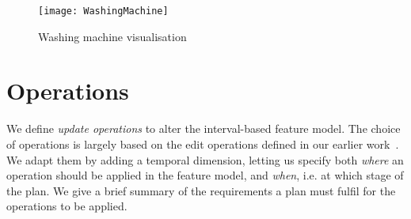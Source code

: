 \begin{figure}[htpb]
  \centering
  \texttt{[image: WashingMachine]}
  \caption{Washing machine visualisation}
  \label{ex:washing-machine-visual}
\end{figure}

\section{Operations}
\label{sec:operations}

We define \emph{update operations} to alter the interval-based feature model. The choice of operations is largely based on the edit operations defined in our earlier work~\cite{art:consistency-preserving-evolution-planning}. We adapt them by adding a temporal dimension, letting us specify both \emph{where} an operation should be applied in the feature model, and \emph{when}, i.e. at which stage of the plan. We give a brief summary of the requirements a plan must fulfil for the operations to be applied.

